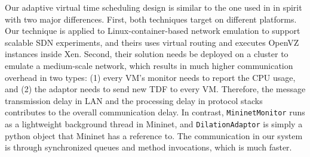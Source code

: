 

Our adaptive virtual time scheduling design is similar to the one used in \cite{NtwkEmultAdaptVirtTime} in spirit with two major differences. First, both techniques target on different platforms. Our technique is applied to Linux-container-based network emulation to support scalable SDN experiments, and theirs uses virtual routing and executes OpenVZ instances inside Xen. Second, their solution needs be deployed on a cluster to emulate a medium-scale network, which results in much higher communication overhead in two types: (1) every VM's monitor needs to report the CPU usage, and (2) the adaptor needs to send new TDF to every VM. Therefore, the message transmission delay in LAN and the processing delay in protocol stacks contributes to the overall communication delay. In contrast, \texttt{MininetMonitor} runs as a lightweight background thread in Mininet, and \texttt{DilationAdaptor} is simply a python object that Mininet has a reference to. The communication in our system is through synchronized queues and method invocations, which is much faster. 

